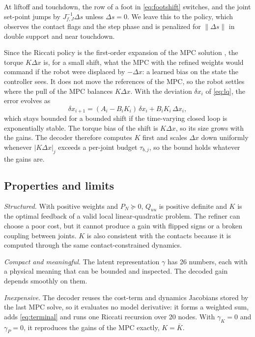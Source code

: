\documentclass[conference]{IEEEtran}
\begin{document}
At liftoff and touchdown, the row of a foot in \eqref{eq:footshift} switches, and the joint set-point jumps by $J_{f,J}^{-1}\Delta s$ unless $\Delta s=0$.
We leave this to the policy, which observes the contact flags and the step phase and is penalized for $\|\Delta s\|$ in double support and near touchdown.

Since the Riccati policy is the first-order expansion of the MPC solution \cite{fiacco1983sensitivity,dantec2022firstorder}, the torque $K\Delta x$ is, for a small shift, what the MPC with the refined weights would command if the robot were displaced by $-\Delta x$: a learned bias on the state the controller sees.
It does not move the references of the MPC, so the robot settles where the pull of the MPC balances $K\Delta x$.
With the deviation $\delta x_i$ of \eqref{eq:lq}, the error evolves as
\begin{equation}
\delta x_{i+1}=(A_i-B_iK_i)\,\delta x_i+B_iK_i\,\Delta x_i ,
\label{eq:cl}
\end{equation}
which stays bounded for a bounded shift if the time-varying closed loop is exponentially stable.
The torque bias of the shift is $K\Delta x$, so its size grows with the gains.
The decoder therefore computes $K$ first and scales $\Delta x$ down uniformly whenever $|K\Delta x|_j$ exceeds a per-joint budget $\tau_{b,j}$, so the bound holds whatever the gains are.

\subsection{Properties and limits}
\emph{Structured.} With positive weights and $P_N\succeq0$, $Q_{uu}$ is positive definite and $K$ is the optimal feedback of a valid local linear-quadratic problem.
The refiner can choose a poor cost, but it cannot produce a gain with flipped signs or a broken coupling between joints.
$K$ is also consistent with the contacts because it is computed through the same contact-constrained dynamics.

\emph{Compact and meaningful.} The latent representation $\gamma$ has 26 numbers, each with a physical meaning that can be bounded and inspected.
The decoded gain depends smoothly on them.

\emph{Inexpensive.} The decoder reuses the cost-term and dynamics Jacobians stored by the last MPC solve, so it evaluates no model derivative: it forms a weighted sum, adds \eqref{eq:terminal} and runs one Riccati recursion over 20 nodes.
With $\gamma_K=0$ and $\gamma_P=0$, it reproduces the gains of the MPC exactly, $K=\bar K$.
\end{document}
